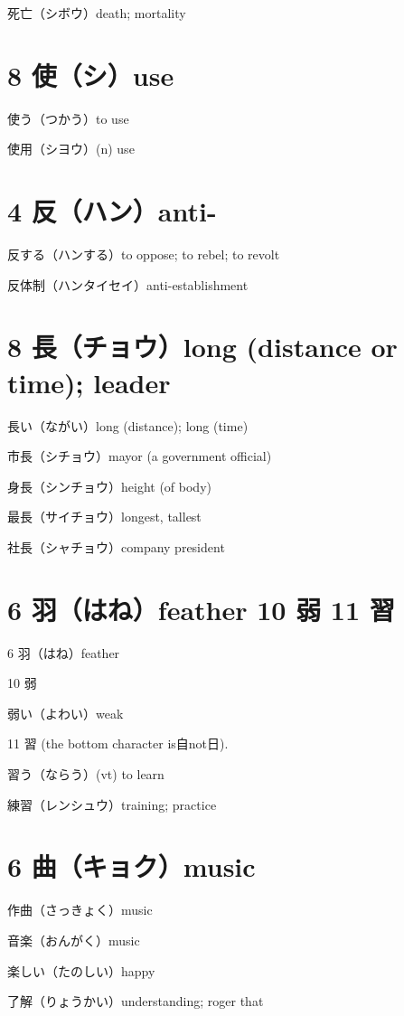 死亡（シボウ）death; mortality

\section{8 使（シ）use}

使う（つかう）to use

使用（シヨウ）(n) use

\section{4 反（ハン）anti-}

反する（ハンする）to oppose; to rebel; to revolt

反体制（ハンタイセイ）anti-establishment

\section{8 長（チョウ）long (distance or time); leader}

長い（ながい）long (distance); long (time)

市長（シチョウ）mayor (a government official)

身長（シンチョウ）height (of body)

最長（サイチョウ）longest, tallest

社長（シャチョウ）company president

\section{6 羽（はね）feather 10 弱 11 習}

6 羽（はね）feather

10 弱

弱い（よわい）weak

11 習 (the bottom character is自not日).

習う（ならう）(vt) to learn

練習（レンシュウ）training; practice

\section{6 曲（キョク）music}

作曲（さっきょく）music

音楽（おんがく）music

楽しい（たのしい）happy

了解（りょうかい）understanding; roger that

